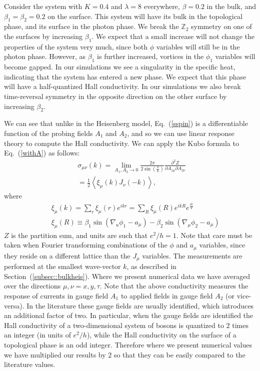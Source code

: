 \documentclass[prb,twocolumn]{revtex4-1}
\begin{document}
Consider the system with $K=0.4$ and $\lambda=8$ everywhere, $\beta=0.2$ in the bulk, and $\beta_{1}=\beta_{2}=0.2$ on the surface. This system will have its bulk in the topological phase, and its surface in the photon phase. We break the $\mathbb{Z}_2$ symmetry on one of the surfaces by increasing $\beta_{1}$. We expect that a small increase will not change the properties of the system very much, since both $\phi$ variables will still be in the photon phase.\cite{LesikAshvin2} However, as $\beta_1$ is further increased, vortices in the $\phi_1$ variables will become gapped. In our simulations we see a singularity in the specific heat, indicating that the system has entered a new phase. We expect that this phase will have a half-quantized Hall conductivity. In our simulations we also break time-reversal symmetry in the opposite direction on the other surface by increasing $\beta_2$. 

 We can see that unlike in the Heisenberg model, Eq.~(\ref{sspin}) is a differentiable function of the probing fields $A_1$ and $A_2$, and so we can use linear response theory to compute the Hall conductivity. We can apply the Kubo formula to Eq.~(\ref{withA}) as follows:
\begin{eqnarray}
&&\sigma_{\mu\nu}(k)=\lim_{A_1,A_2 \to 0}\frac{2\pi}{2\sin\left(\frac{\pi}{L}\right)}\frac{\partial^2 Z}{\partial A_{1\mu}\partial A_{2\nu}}~~~~~\\
&&=\frac{1}{2}\left\langle\xi_\mu(k)J_{\nu}(-k) \right\rangle,\nonumber
\end{eqnarray}
where
\begin{eqnarray}
&&\xi_\mu(k)=\sum_r \xi_\mu(r)e^{ikr}=\sum_R \xi_\mu(R)e^{ikR}e^{\frac{ik}{2}}\nonumber\\
&&\xi_\mu(R)\equiv\beta_1\sin(\nabla_u\phi_1-a_\mu)-\beta_2\sin(\nabla_\mu\phi_2-a_\mu)
\end{eqnarray}
$Z$ is the partition sum, and units are such that $e^2/h=1$. Note that care must be taken when Fourier transforming combinations of the $\phi$ and $a_\mu$ variables, since they reside on a different lattice than the $J_\mu$ variables. The measurements are performed at the smallest wave-vector $k$, as described in Section~(\ref{subsec::bulkheis}). Where we present numerical data we have averaged over the directions $\mu,\nu=x,y,\tau$. Note that the above conductivity measures the response of currents in gauge field $A_1$ to applied fields in gauge field $A_2$ (or vice-versa). In the literature these gauge fields are usually identified, which introduces an additional factor of two. In particular, when the gauge fields are identified the Hall conductivity of a two-dimensional system of bosons is quantized to $2$ times an integer (in units of $e^2/h$), while the Hall conductivity on the surface of a topological phase is an odd integer. Therefore where we present numerical values we have multiplied our results by $2$ so that they can be easily compared to the literature values.
\end{document}
